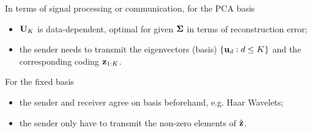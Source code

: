 \documentclass[../book-template.tex]{subfiles}
\begin{document}
\par In terms of signal processing or communication, for the PCA basis
\begin{itemize}
	\item ${\bf U}_K$ is data-dependent, optimal for given ${\bf \Sigma}$ in terms of reconstruction error;
	\item the sender needs to transmit the eigenvectors (basis) $\{{\bf u}_d:d\leq K\}$ and the corresponding coding ${\bf z}_{1:K}$.
\end{itemize}
For the fixed basis
\begin{itemize}
	\item the sender and receiver agree on basis beforehand, e.g. Haar Wavelets;
	\item the sender only have to transmit the non-zero elements of $\hat{\bf z}$.
\end{itemize}
\end{document}
